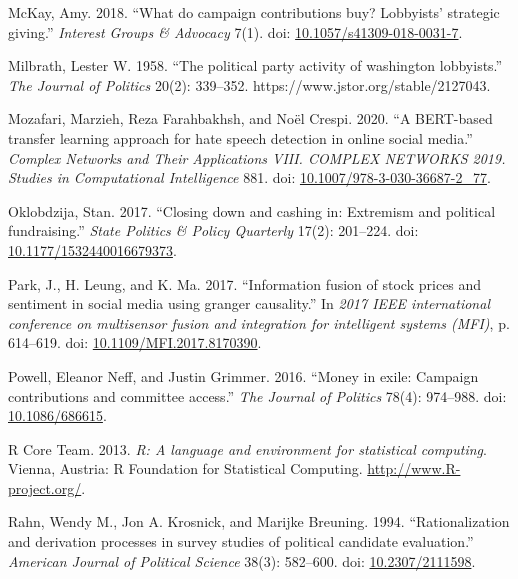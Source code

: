 \documentclass[12pt,]{article}
\newlength{\cslhangindent}
\newenvironment{CSLReferences}[2]%
    {\setlength{\parindent}{0pt}%
    \everypar{\setlength{\hangindent}{\cslhangindent}}\ignorespaces}%
    {\par}
\begin{document}
\begin{CSLReferences}{1}{0}
\leavevmode{}%
McKay, Amy. 2018. {``What do campaign contributions buy? Lobbyists'
strategic giving.''} \emph{Interest Groups \& Advocacy} 7(1). doi:
\href{https://doi.org/10.1057/s41309-018-0031-7}{10.1057/s41309-018-0031-7}.

\leavevmode{}%
Milbrath, Lester W. 1958. {``The political party activity of washington
lobbyists.''} \emph{The Journal of Politics} 20(2): 339--352.
https://www.jstor.org/stable/2127043.

\leavevmode{}%
Mozafari, Marzieh, Reza Farahbakhsh, and Noël Crespi. 2020. {``A
BERT-based transfer learning approach for hate speech detection in
online social media.''} \emph{Complex Networks and Their Applications
VIII. COMPLEX NETWORKS 2019. Studies in Computational Intelligence} 881.
doi:
\href{https://doi.org/10.1007/978-3-030-36687-2_77}{10.1007/978-3-030-36687-2\_77}.

\leavevmode{}%
Oklobdzija, Stan. 2017. {``Closing down and cashing in: Extremism and
political fundraising.''} \emph{State Politics \& Policy Quarterly}
17(2): 201--224. doi:
\href{https://doi.org/10.1177/1532440016679373}{10.1177/1532440016679373}.

\leavevmode{}%
Park, J., H. Leung, and K. Ma. 2017. {``Information fusion of stock
prices and sentiment in social media using granger causality.''} In
\emph{2017 IEEE international conference on multisensor fusion and
integration for intelligent systems (MFI)}, p. 614--619. doi:
\href{https://doi.org/10.1109/MFI.2017.8170390}{10.1109/MFI.2017.8170390}.

\leavevmode{}%
Powell, Eleanor Neff, and Justin Grimmer. 2016. {``Money in exile:
Campaign contributions and committee access.''} \emph{The Journal of
Politics} 78(4): 974--988. doi:
\href{https://doi.org/10.1086/686615}{10.1086/686615}.

\leavevmode{}%
R Core Team. 2013. \emph{R: A language and environment for statistical
computing}. Vienna, Austria: R Foundation for Statistical Computing.
\url{http://www.R-project.org/}.

\leavevmode{}%
Rahn, Wendy M., Jon A. Krosnick, and Marijke Breuning. 1994.
{``Rationalization and derivation processes in survey studies of
political candidate evaluation.''} \emph{American Journal of Political
Science} 38(3): 582--600. doi:
\href{https://doi.org/10.2307/2111598}{10.2307/2111598}.


\end{CSLReferences}
\end{document}
